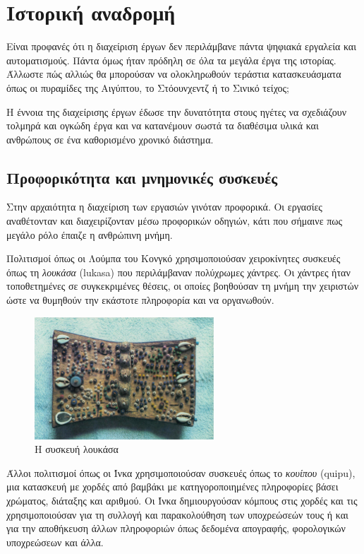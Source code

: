     \section{Ιστορική αναδρομή}
        Είναι προφανές ότι η διαχείριση έργων δεν περιλάμβανε πάντα ψηφιακά εργαλεία και αυτοματισμούς. Πάντα όμως ήταν πρόδηλη σε όλα τα μεγάλα έργα της ιστορίας. Άλλωστε πώς αλλιώς θα μπορούσαν να ολοκληρωθούν τεράστια κατασκευάσματα όπως οι πυραμίδες της Αιγύπτου, το Στόουνχεντζ ή το Σινικό τείχος;
        
        Η έννοια της διαχείρισης έργων έδωσε την δυνατότητα στους ηγέτες να σχεδιάζουν τολμηρά και ογκώδη έργα και να κατανέμουν σωστά τα διαθέσιμα υλικά και ανθρώπους σε ένα καθορισμένο χρονικό διάστημα. 
        
        \subsection{Προφορικότητα και μνημονικές συσκευές}
            Στην αρχαιότητα η διαχείριση των εργασιών γινόταν προφορικά. Οι εργασίες αναθέτονταν και διαχειρίζονταν μέσω προφορικών οδηγιών, κάτι που σήμαινε πως μεγάλο ρόλο έπαιζε η ανθρώπινη μνήμη. \cite{Goody2013}

            Πολιτισμοί όπως οι Λούμπα του Κονγκό χρησιμοποιούσαν χειροκίνητες συσκευές όπως τη \textit{λουκάσα} (lukasa) που περιλάμβαναν πολύχρωμες χάντρες. Οι χάντρες ήταν τοποθετημένες σε συγκεκριμένες θέσεις, οι οποίες βοηθούσαν τη μνήμη την χειριστών ώστε να θυμηθούν την εκάστοτε πληροφορία και να οργανωθούν. \cite{Lukasa}

            \begin{figure}[H] \noindent \centering
                \includegraphics[width=0.6\textwidth]{img/Lukasa.jpg}
                \caption{Η συσκευή λουκάσα}
            \end{figure}
            
            Άλλοι πολιτισμοί όπως οι Ίνκα χρησιμοποιούσαν συσκευές όπως το \textit{κουίπου} \linebreak (quipu), μια κατασκευή με χορδές από βαμβάκι με κατηγοροποιημένες πληροφορίες βάσει χρώματος, διάταξης και αριθμού. Οι Ίνκα δημιουργούσαν κόμπους στις χορδές και τις χρησιμοποιούσαν για τη συλλογή και παρακολούθηση των υποχρεώσεών τους ή και για την αποθήκευση άλλων πληροφοριών όπως δεδομένα απογραφής, φορολογικών υποχρεώσεων και άλλα. \cite{Quipu}

